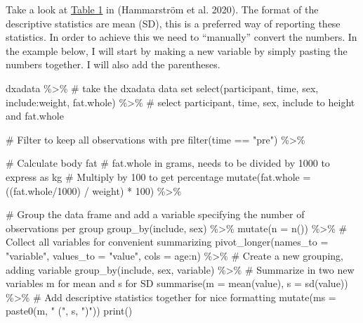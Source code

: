 \documentclass[
  11pt,
  letterpaper,
]{scrbook}
\newenvironment{Shaded}{\begin{snugshade}}{\end{snugshade}}
\newcommand{\AttributeTok}[1]{\textcolor[rgb]{0.40,0.45,0.13}{#1}}
\newcommand{\CommentTok}[1]{\textcolor[rgb]{0.37,0.37,0.37}{#1}}
\newcommand{\DecValTok}[1]{\textcolor[rgb]{0.68,0.00,0.00}{#1}}
\newcommand{\FunctionTok}[1]{\textcolor[rgb]{0.28,0.35,0.67}{#1}}
\newcommand{\NormalTok}[1]{\textcolor[rgb]{0.00,0.23,0.31}{#1}}
\newcommand{\SpecialCharTok}[1]{\textcolor[rgb]{0.37,0.37,0.37}{#1}}
\newcommand{\StringTok}[1]{\textcolor[rgb]{0.13,0.47,0.30}{#1}}
\begin{document}
Take a look at
\href{https://physoc.onlinelibrary.wiley.com/doi/full/10.1113/JP278455}{Table
1} in (Hammarström et al. 2020). The format of the descriptive
statistics are mean (SD), this is a preferred way of reporting these
statistics. In order to achieve this we need to ``manually'' convert the
numbers. In the example below, I will start by making a new variable by
simply pasting the numbers together. I will also add the parentheses.

\begin{Shaded}
\begin{Highlighting}[numbers=left,,]
\NormalTok{dxadata }\SpecialCharTok{\%\textgreater{}\%} \CommentTok{\# take the dxadata data set}
  \FunctionTok{select}\NormalTok{(participant, time, sex, include}\SpecialCharTok{:}\NormalTok{weight, fat.whole) }\SpecialCharTok{\%\textgreater{}\%} 
  \CommentTok{\# select participant, time, sex, include to height and fat.whole}
  
  \CommentTok{\# Filter to keep all observations with pre}
  \FunctionTok{filter}\NormalTok{(time }\SpecialCharTok{==} \StringTok{"pre"}\NormalTok{) }\SpecialCharTok{\%\textgreater{}\%}
  
  \CommentTok{\# Calculate body fat}
  \CommentTok{\# fat.whole in grams, needs to be divided by 1000 to express as kg}
  \CommentTok{\# Multiply by 100 to get percentage}
  \FunctionTok{mutate}\NormalTok{(}\AttributeTok{fat.whole =}\NormalTok{ ((fat.whole}\SpecialCharTok{/}\DecValTok{1000}\NormalTok{) }\SpecialCharTok{/}\NormalTok{ weight) }\SpecialCharTok{*} \DecValTok{100}\NormalTok{) }\SpecialCharTok{\%\textgreater{}\%}
  
  \CommentTok{\# Group the data frame and add a variable specifying the number of observations per group}
  \FunctionTok{group\_by}\NormalTok{(include, sex) }\SpecialCharTok{\%\textgreater{}\%}
  \FunctionTok{mutate}\NormalTok{(}\AttributeTok{n =} \FunctionTok{n}\NormalTok{()) }\SpecialCharTok{\%\textgreater{}\%}
  \CommentTok{\# Collect all variables for convenient summarizing}
  \FunctionTok{pivot\_longer}\NormalTok{(}\AttributeTok{names\_to =} \StringTok{"variable"}\NormalTok{, }
               \AttributeTok{values\_to =} \StringTok{"value"}\NormalTok{, }
               \AttributeTok{cols =}\NormalTok{ age}\SpecialCharTok{:}\NormalTok{n) }\SpecialCharTok{\%\textgreater{}\%}
  \CommentTok{\# Create a new grouping, adding variable}
  \FunctionTok{group\_by}\NormalTok{(include, sex, variable) }\SpecialCharTok{\%\textgreater{}\%}
  \CommentTok{\# Summarize in two new variables m for mean and s for SD}
  \FunctionTok{summarise}\NormalTok{(}\AttributeTok{m =} \FunctionTok{mean}\NormalTok{(value), }
            \AttributeTok{s =} \FunctionTok{sd}\NormalTok{(value)) }\SpecialCharTok{\%\textgreater{}\%}
  \CommentTok{\# Add descriptive statistics together for nice formatting}
  \FunctionTok{mutate}\NormalTok{(}\AttributeTok{ms =} \FunctionTok{paste0}\NormalTok{(m, }\StringTok{" ("}\NormalTok{, s, }\StringTok{")"}\NormalTok{))}
  \FunctionTok{print}\NormalTok{()}
\end{Highlighting}
\end{Shaded}
\end{document}
